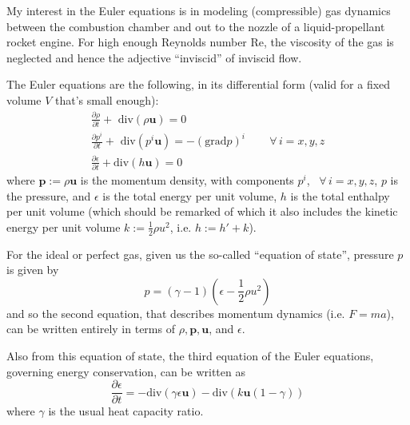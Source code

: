 \documentclass[10pt]{amsart}
\begin{document}
My interest in the Euler equations is in modeling (compressible) gas dynamics between the combustion chamber and out to the nozzle of a liquid-propellant rocket engine.  For high enough Reynolds number $\text{Re}$, the viscosity of the gas is neglected and hence the adjective ``inviscid'' of inviscid flow.

The Euler equations are the following, in its differential form (valid for a fixed volume $V$ that's small enough):
\begin{equation}
\begin{gathered}
  \frac{ \partial \rho }{ \partial t} + \text{ div}( \rho \mathbf{u} ) = 0 \\ 
  \frac{ \partial p^i }{ \partial t} + \text{ div}( p^i \mathbf{u} ) = - (\text{grad}p)^i \qquad \, \forall \, i = x,y,z \\
  \frac{ \partial \epsilon}{ \partial t} + \text{div}( h \mathbf{u} ) = 0
  \end{gathered}
  \end{equation}
where $\mathbf{p} := \rho \mathbf{u}$ is the momentum density, with components $p^i$, \, $\forall \, i = x,y,z$, $p$ is the pressure, and $\epsilon$ is the total energy per unit volume, $h$ is the total enthalpy per unit volume (which should be remarked of which it also includes the kinetic energy per unit volume $k:= \frac{1}{2} \rho u^2$, i.e. $h := h' + k$).

For the ideal or perfect gas, given us the so-called ``equation of state'', pressure $p$ is given by
\[
p = (\gamma - 1) (\epsilon - \frac{1}{2} \rho u^2)
\]
and so the second equation, that describes momentum dynamics (i.e. $F=ma$), can be written entirely in terms of $\rho, \mathbf{p}, \mathbf{u}$, and $\epsilon$.

Also from this equation of state, the third equation of the Euler equations, governing energy conservation, can be written as
\[
\frac{ \partial \epsilon }{ \partial t} = -\text{div}(\gamma \epsilon \mathbf{u}) - \text{div}(k\mathbf{u}(1-\gamma ) )
\]
where $\gamma$ is the usual heat capacity ratio.  
\end{document}
